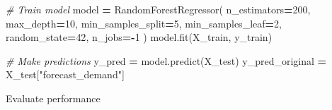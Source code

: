 \documentclass[mstat,12pt]{unswthesis}
\newenvironment{Shaded}{\begin{snugshade}}{\end{snugshade}}
\newcommand{\CommentTok}[1]{\textcolor[rgb]{0.56,0.35,0.01}{\textit{#1}}}
\newcommand{\DecValTok}[1]{\textcolor[rgb]{0.00,0.00,0.81}{#1}}
\newcommand{\NormalTok}[1]{#1}
\newcommand{\OperatorTok}[1]{\textcolor[rgb]{0.81,0.36,0.00}{\textbf{#1}}}
\newcommand{\StringTok}[1]{\textcolor[rgb]{0.31,0.60,0.02}{#1}}
\begin{document}
\begin{Shaded}
\begin{Highlighting}[]
\CommentTok{\# Train model}
\NormalTok{model }\OperatorTok{=}\NormalTok{ RandomForestRegressor(}
\NormalTok{    n\_estimators}\OperatorTok{=}\DecValTok{200}\NormalTok{,}
\NormalTok{    max\_depth}\OperatorTok{=}\DecValTok{10}\NormalTok{,}
\NormalTok{    min\_samples\_split}\OperatorTok{=}\DecValTok{5}\NormalTok{,}
\NormalTok{    min\_samples\_leaf}\OperatorTok{=}\DecValTok{2}\NormalTok{,}
\NormalTok{    random\_state}\OperatorTok{=}\DecValTok{42}\NormalTok{,}
\NormalTok{    n\_jobs}\OperatorTok{={-}}\DecValTok{1}
\NormalTok{)}
\NormalTok{model.fit(X\_train, y\_train)}

\CommentTok{\# Make predictions}
\NormalTok{y\_pred }\OperatorTok{=}\NormalTok{ model.predict(X\_test)}
\NormalTok{y\_pred\_original }\OperatorTok{=}\NormalTok{ X\_test[}\StringTok{"forecast\_demand"}\NormalTok{]}
\end{Highlighting}
\end{Shaded}

\noindent Evaluate performance
\end{document}
